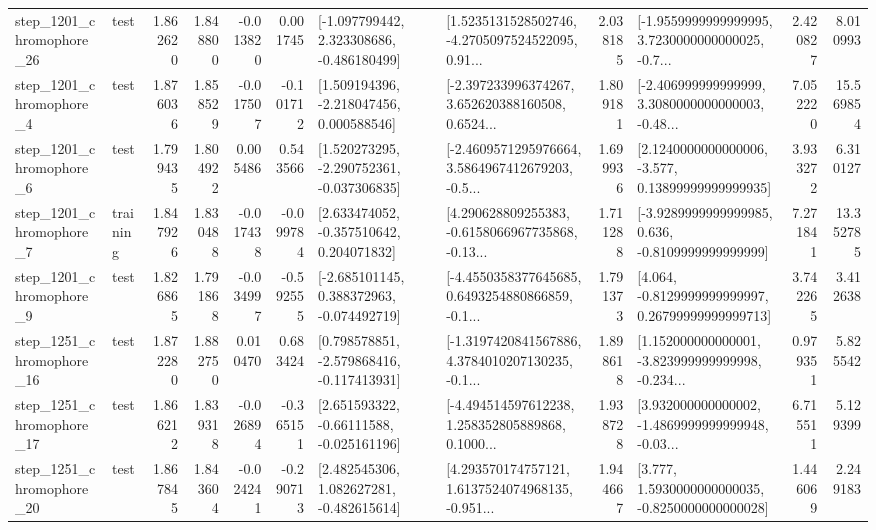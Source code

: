 \begin{tabular}{llrrrrllrlrr}
 step\_1201\_chromophore\_26 &      test &      1.862620 &    1.848800 &     -0.013820 &  0.001745 &   [-1.097799442, 2.323308686, -0.486180499] &  [1.5235131528502746, -4.2705097524522095, 0.91... &       2.038185 &  [-1.9559999999999995, 3.7230000000000025, -0.7... &            2.420827 &          8.010993 \\
  step\_1201\_chromophore\_4 &      test &      1.876036 &    1.858529 &     -0.017507 & -0.101712 &    [1.509194396, -2.218047456, 0.000588546] &  [-2.397233996374267, 3.652620388160508, 0.6524... &       1.809181 &  [-2.406999999999999, 3.3080000000000003, -0.48... &            7.052220 &         15.569854 \\
  step\_1201\_chromophore\_6 &      test &      1.799435 &    1.804922 &      0.005486 &  0.543566 &   [1.520273295, -2.290752361, -0.037306835] &  [-2.4609571295976664, 3.5864967412679203, -0.5... &       1.699936 &  [2.1240000000000006, -3.577, 0.13899999999999935] &            3.933272 &          6.310127 \\
  step\_1201\_chromophore\_7 &  training &      1.847926 &    1.830488 &     -0.017438 & -0.099784 &    [2.633474052, -0.357510642, 0.204071832] &  [4.290628809255383, -0.6158066967735868, -0.13... &       1.711288 &  [-3.9289999999999985, 0.636, -0.8109999999999999] &            7.271841 &         13.352785 \\
  step\_1201\_chromophore\_9 &      test &      1.826865 &    1.791868 &     -0.034997 & -0.592555 &   [-2.685101145, 0.388372963, -0.074492719] &  [-4.4550358377645685, 0.6493254880866859, -0.1... &       1.791373 &  [4.064, -0.8129999999999997, 0.26799999999999713] &            3.742265 &          3.412638 \\
 step\_1251\_chromophore\_16 &      test &      1.872280 &    1.882750 &      0.010470 &  0.683424 &   [0.798578851, -2.579868416, -0.117413931] &  [-1.3197420841567886, 4.3784010207130235, -0.1... &       1.898618 &  [1.152000000000001, -3.823999999999998, -0.234... &            0.979351 &          5.825542 \\
 step\_1251\_chromophore\_17 &      test &      1.866212 &    1.839318 &     -0.026894 & -0.365151 &    [2.651593322, -0.66111588, -0.025161196] &  [-4.494514597612238, 1.258352805889868, 0.1000... &       1.938728 &  [3.932000000000002, -1.4869999999999948, -0.03... &            6.715511 &          5.129399 \\
 step\_1251\_chromophore\_20 &      test &      1.867845 &    1.843604 &     -0.024241 & -0.290713 &    [2.482545306, 1.082627281, -0.482615614] &  [4.293570174757121, 1.6137524074968135, -0.951... &       1.944667 &   [3.777, 1.5930000000000035, -0.8250000000000028] &            1.446069 &          2.249183 \\

\end{tabular}
